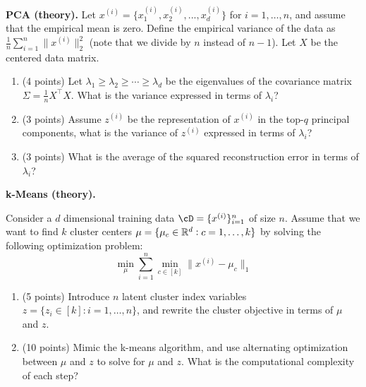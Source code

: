 \documentclass{article}
\begin{document}
\begin{enumerate}
\begin{Q}
\begin{enumerate}
      \end{enumerate}
  \end{Q}

  \begin{Q}
    \textbf{PCA (theory).}
    Let $x^{(i)} = \{x^{(i)}_1, x^{(i)}_2,  ..., x^{(i)}_d\}$ for
    $i=1,\ldots,n$, and assume that the empirical mean is zero. Define
    the empirical variance of the data as $\frac1n \sum_{i=1}^n
    \|x^{(i)}\|_2^2$ (note that we divide by $n$ instead of
    $n-1$). Let $X$ be the centered data matrix.
    \begin{enumerate}
    \item (4 points) Let $\lambda_1 \geq \lambda_2 \geq \cdots \geq \lambda_d$  be the
      eigenvalues of the covariance matrix  $\Sigma = \frac{1}{n}
      X^\top X$.
      What is the variance expressed in terms of $\lambda_i$?

    \item (3 points) Assume $z^{(i)}$ be the representation of $x^{(i)}$ in the
      top-$q$ principal components, what is the variance of $z^{(i)}$
      expressed in terms of $\lambda_i$?

    \item (3 points) What is the average of the squared reconstruction
      error in terms of $\lambda_i$?
      
    \end{enumerate}
    
  \end{Q}


  \begin{Q}
    \textbf{k-Means (theory).}

    Consider a $d$ dimensional training data
    $\cD=\{x^{(i)}\}_{i=1}^n$ of size $n$. 
    Assume that we want to find $k$ cluster centers
    $\mu=\{\mu_c \in \mathbb{R}^d: c=1,\ldots,k\}$ by solving the following
    optimization problem:
    \[
      \min_{\mu} \sum_{i=1}^n \min_{c \in [k]} \|x^{(i)}-\mu_{c}\|_1
    \]
    \begin{enumerate}
    \item (5 points) Introduce
      $n$ latent cluster index variables
      $z=\{z_i \in [k]: i=1,\ldots,n\}$, and rewrite the cluster
      objective in terms of $\mu$ and $z$.


  \item (10 points)
    Mimic the k-means algorithm, and use alternating optimization between
    $\mu$ and $z$ to solve for $\mu$ and $z$. What is the
    computational complexity of each step?
    


\end{enumerate}
\end{Q}
\end{enumerate}
\end{document}
